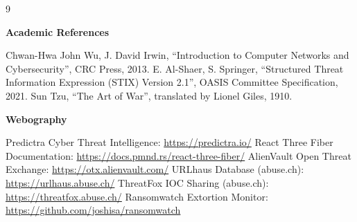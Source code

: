 \documentclass[12pt,a4paper,oneside]{book}
\begin{document}
\renewcommand{\bibname}{Bibliography and Netography}
\begin{thebibliography}{9}

\item[] \hspace{-1cm} \textbf{\Large Academic References}
\vspace{0.3cm}

 Chwan-Hwa John Wu, J. David Irwin, ``Introduction to Computer Networks and Cybersecurity'', CRC Press, 2013.
 E. Al-Shaer, S. Springer, ``Structured Threat Information Expression (STIX) Version 2.1'', OASIS Committee Specification, 2021.
 Sun Tzu, ``The Art of War'', translated by Lionel Giles, 1910.

\item[] \hspace{-1cm} \textbf{\Large Webography}
\vspace{0.3cm}

 Predictra Cyber Threat Intelligence: \url{https://predictra.io/}
 React Three Fiber Documentation: \url{https://docs.pmnd.rs/react-three-fiber/}
 AlienVault Open Threat Exchange: \url{https://otx.alienvault.com/}
 URLhaus Database (abuse.ch): \url{https://urlhaus.abuse.ch/}
 ThreatFox IOC Sharing (abuse.ch): \url{https://threatfox.abuse.ch/}
 Ransomwatch Extortion Monitor: \url{https://github.com/joshisa/ransomwatch}

\end{thebibliography}


\end{document}
